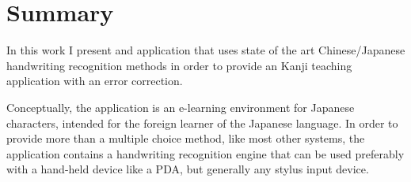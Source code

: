 
\chapter*{Summary}
\label{chap:summary}
\pagestyle{empty}


  



    



In this work I present and application that uses state of the art 
Chinese/Japanese handwriting recognition methods in order to provide 
an Kanji teaching application with an error correction.

Conceptually, the application is an e-learning environment for Japanese 
characters, intended for the foreign learner of the Japanese language. 
In order to provide more than a  multiple choice method, like most other 
systems, the application contains a handwriting recognition engine that can
be used preferably with a hand-held device like a PDA, but generally any 
stylus input device.

